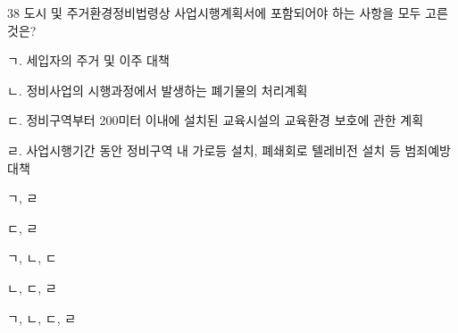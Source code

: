 \begin{question}{38}
도시 및 주거환경정비법령상 사업시행계획서에 포함되어야 하는 사항을 모두 고른 것은?
\begin{framedtext}
ㄱ. 세입자의 주거 및 이주 대책 \par
ㄴ. 정비사업의 시행과정에서 발생하는 폐기물의 처리계획 \par
ㄷ. 정비구역부터 200미터 이내에 설치된 교육시설의 교육환경 보호에 관한 계획 \par
ㄹ. 사업시행기간 동안 정비구역 내 가로등 설치, 폐쇄회로 텔레비전 설치 등 범죄예방대책 \par
\end{framedtext}
\begin{choices}
  \item ㄱ, ㄹ
  \item ㄷ, ㄹ
  \item ㄱ, ㄴ, ㄷ
  \item ㄴ, ㄷ, ㄹ
  \item ㄱ, ㄴ, ㄷ, ㄹ
\end{choices}
\end{question}
